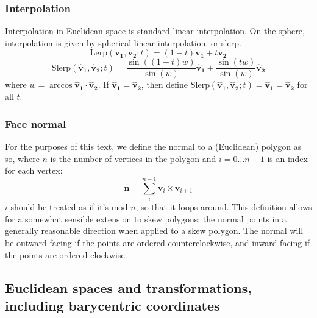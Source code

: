 \documentclass{amsart}[12pt]
\begin{document}
\subsubsection{Interpolation}
Interpolation in Euclidean space is standard linear interpolation. On the
sphere, interpolation is given by spherical linear interpolation, or slerp.
\begin{equation}
\mathrm{Lerp}(\mathbf{v_1}, \mathbf{v_2}; t) =
       (1-t) \mathbf{v_1} + t \mathbf{v_2}
\end{equation}
\begin{equation}
\mathrm{Slerp}(\mathbf{\hat{v}_1}, \mathbf{\hat{v}_2}; t) =
        \frac{\sin ((1-t)w)}{\sin (w)} \mathbf{\hat{v}_1} +
       \frac{\sin (tw)}{\sin (w)} \mathbf{\hat{v}_2}
\end{equation}
where $w = \arccos \mathbf{\hat{v}_1} \cdot \mathbf{\hat{v}_2}$. If $\mathbf{\hat{v}_1} = \mathbf{\hat{v}_2}$, then define $\mathrm{Slerp}(\mathbf{\hat{v}_1}, \mathbf{\hat{v}_2}; t) =
\mathbf{\hat{v}_1} = \mathbf{\hat{v}_2}$ for all $t$.

\subsubsection{Face normal}
For the purposes of this text, we define the normal to a (Euclidean) polygon as
so, where $n$ is the number of vertices in the polygon and
$i = 0 \dots n-1$ is an index for each vertex:
\begin{equation}
  \mathbf{\widetilde{n}} =
  \sum^{n-1}_i \mathbf{v}_i \times \mathbf{v}_{i+1}
\end{equation}
$i$ should be treated as if it's mod $n$, so that it loops around.
This definition allows for a somewhat sensible extension to skew polygons:
the normal points in a generally reasonable direction when applied to a skew
polygon. The normal will be outward-facing if the points are ordered
counterclockwise, and inward-facing if the points are ordered clockwise.

\subsection{Euclidean spaces and transformations, including barycentric coordinates}
\end{document}
